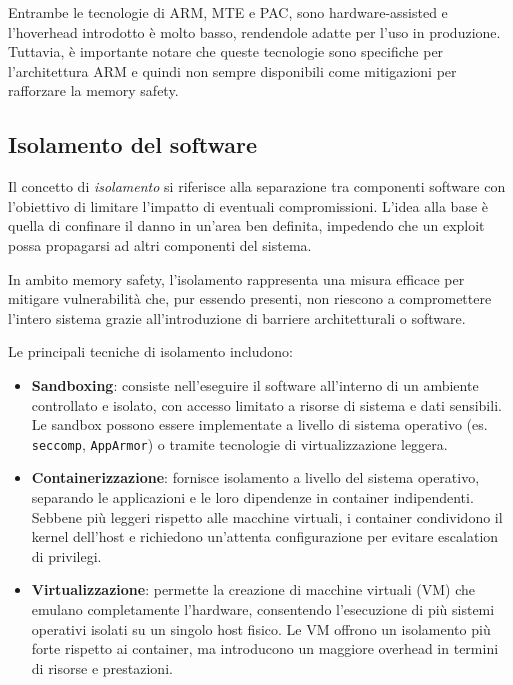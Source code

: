 \bigskip
\noindent
Entrambe le tecnologie di ARM, MTE e PAC, sono hardware-assisted e l'hoverhead introdotto
è molto basso, rendendole adatte per l'uso in produzione. Tuttavia, è importante
notare che queste tecnologie sono specifiche per l'architettura ARM e quindi non
sempre disponibili come mitigazioni per rafforzare la memory safety.

\subsection{Isolamento del software}
\label{sec:isolation}

Il concetto di \textit{isolamento} si riferisce alla separazione tra componenti
software con l'obiettivo di limitare l'impatto di eventuali compromissioni. L'idea
alla base è quella di confinare il danno in un'area ben definita, impedendo che
un exploit possa propagarsi ad altri componenti del sistema.

In ambito memory safety, l'isolamento rappresenta una misura efficace per mitigare
vulnerabilità che, pur essendo presenti, non riescono a compromettere l'intero sistema
grazie all'introduzione di barriere architetturali o software.

Le principali tecniche di isolamento includono:
\begin{itemize}
  \item \textbf{Sandboxing}: consiste nell'eseguire il software all'interno di un
    ambiente controllato e isolato, con accesso limitato a risorse di sistema e
    dati sensibili. Le sandbox possono essere implementate a livello di sistema operativo
    (es. \texttt{seccomp}, \texttt{AppArmor}) o tramite tecnologie di virtualizzazione
    leggera.

  \item \textbf{Containerizzazione}: fornisce isolamento a livello del sistema operativo,
    separando le applicazioni e le loro dipendenze in container indipendenti. Sebbene
    più leggeri rispetto alle macchine virtuali, i container condividono il
    kernel dell'host e richiedono un'attenta configurazione per evitare
    escalation di privilegi.

  \item \textbf{Virtualizzazione}: permette la creazione di macchine virtuali (VM)
    che emulano completamente l'hardware, consentendo l'esecuzione di più
    sistemi operativi isolati su un singolo host fisico. Le VM offrono un isolamento
    più forte rispetto ai container, ma introducono un maggiore overhead in
    termini di risorse e prestazioni.
\end{itemize}


